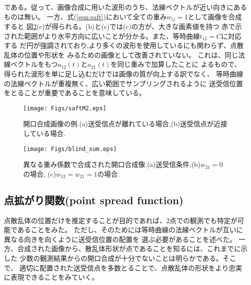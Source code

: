 \documentclass[10pt,a4j,dvipdfmx]{jarticle}
\begin{document}
である。従って、画像合成に用いた波形のうち、法線ベクトルが近い向きにあるものは無い。
一方、式(\ref{eqn:saft})において全ての重み$w_{ij}=1$として画像を合成すると
図\ref{fig:blind_sum}(c)が得られる。(b)と(c)では(c)の方が、大きな画素値を持つ
赤で示された範囲がより水平方向に広いことが分かる。また、等時曲線$t_{12}=C$に対応する
だ円が強調されており,より多くの波形を使用しているにも関わらず、点散乱体の位置や形状を
みるための画像として改善されていない。
これは、同じ法線ベクトルをもつ$a_{12}(t)$と$a_{21}(t)$を同じ重みで加算したことに
よるもので、得られた波形を単に足し込むだけでは画像の質が向上する訳でなく、
等時曲線の法線ベクトルが重複無く、広い範囲でサンプリングされるように
送受信位置をとることが重要であることを意味している。

\begin{figure}[h]
	\begin{center}
	\texttt{[image: Figs/saftM2.eps]} 
	\end{center}
	\caption{開口合成画像の例.(a)送受信点が離れている場合,(b)送受信点が近接している場合.} 
	\label{fig:saftM2}
\end{figure}
\begin{figure}[h]
	\begin{center}
	\texttt{[image: Figs/blind\_sum.eps]} 
	\end{center}
	\caption{異なる重み係数で合成された開口合成像.(a)送受信条件,(b)$w_{21}=0$の場合, (c)$w_{12}=w_{21}=1$の場合.}
	\label{fig:blind_sum}
\end{figure}
\subsection{点拡がり関数(point spread function)}
点散乱体の位置だけを推定することが目的であれば、2点での観測でも特定が可能であることをみた。
ただし、そのためには等時曲線の法線ベクトルが互いに異なる向きを向くように送受信位置の配置を
選ぶ必要があることを述べた。
一方、合成された画像から、散乱体形状が点であることを知るには、これまでに示した
少数の観測結果からの開口合成が十分でないことは明らかである。そこで、
適切に配置された送受信点を多数とることで、点散乱体の形状をより忠実に表現できることをみていく。
\end{document}
